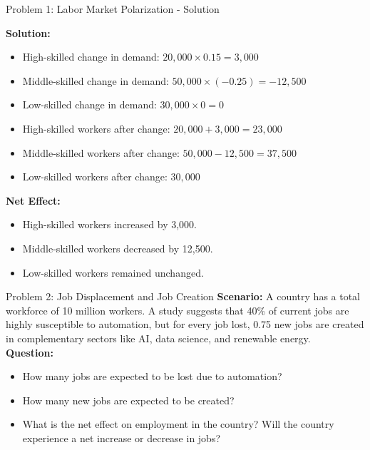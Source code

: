 \documentclass{beamer}
\begin{document}
\begin{frame}{Problem 1: Labor Market Polarization - Solution}


\textbf{Solution:}
\begin{itemize}
    \item High-skilled change in demand: \( 20,000 \times 0.15 = 3,000 \)
    \item Middle-skilled change in demand: \( 50,000 \times (-0.25) = -12,500 \)
    \item Low-skilled change in demand: \( 30,000 \times 0 = 0 \)
    \item High-skilled workers after change: \( 20,000 + 3,000 = 23,000 \)
    \item Middle-skilled workers after change: \( 50,000 - 12,500 = 37,500 \)
    \item Low-skilled workers after change: \( 30,000 \)
\end{itemize}

\textbf{Net Effect:}
\begin{itemize}
    \item High-skilled workers increased by 3,000.
    \item Middle-skilled workers decreased by 12,500.
    \item Low-skilled workers remained unchanged.
\end{itemize}
\end{frame}


\begin{frame}{Problem 2: Job Displacement and Job Creation}
\textbf{Scenario:}
A country has a total workforce of 10 million workers. A study suggests that 40\% of current jobs are highly susceptible to automation, but for every job lost, 0.75 new jobs are created in complementary sectors like AI, data science, and renewable energy.
\vspace{.5cm}\\
\textbf{Question:}
\begin{itemize}
    \item How many jobs are expected to be lost due to automation?
    \item How many new jobs are expected to be created?
    \item What is the net effect on employment in the country? Will the country experience a net increase or decrease in jobs?
\end{itemize}
\end{frame}
\end{document}

